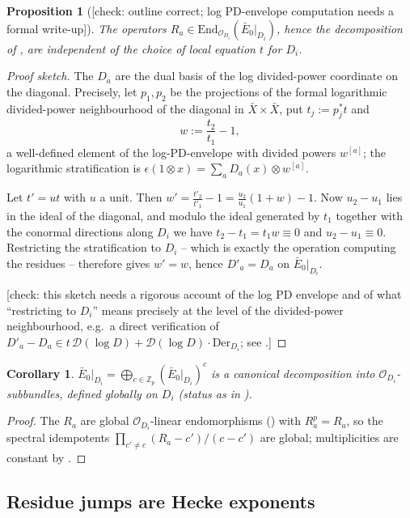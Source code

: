 \documentclass[11pt,reqno]{amsart}
\newcommand{\CHECK}[1]{{\color{blue!70!black}\textsf{[check: #1]}}}
\newcommand{\Zp}{\mathbb{Z}_p}
\newcommand{\cO}{\mathcal{O}}
\newcommand{\cD}{\mathcal{D}}
\newcommand{\End}{\mathrm{End}}
\theoremstyle{plain}
\newtheorem{proposition}[theorem]{Proposition}
\newtheorem{corollary}[theorem]{Corollary}
\theoremstyle{definition}
\theoremstyle{remark}
\numberwithin{equation}{section}
\begin{document}
\begin{proposition}[\CHECK{outline correct; log PD-envelope computation
needs a formal write-up}]\label{prop:coordfree}
The operators $R_a\in\End_{\cO_{D_i}}(\bar E_0|_{D_i})$, hence the
decomposition of , are independent of the choice of local
equation $t$ for $D_i$.
\end{proposition}
\begin{proof}[Proof sketch]
The $D_a$ are the dual basis of the log divided-power coordinate on the
diagonal.  Precisely, let $p_1,p_2$ be the projections of the formal
logarithmic divided-power neighbourhood of the diagonal in
$\bar X\times\bar X$, put $t_j:=p_j^*t$ and
\[
   w:=\frac{t_2}{t_1}-1 ,
\]
a well-defined element of the log-PD-envelope with divided powers
$w^{[a]}$; the logarithmic stratification is
$\epsilon(1\otimes x)=\sum_aD_a(x)\otimes w^{[a]}$.

Let $t'=ut$ with $u$ a unit.  Then
$w'=\tfrac{t'_2}{t'_1}-1=\tfrac{u_2}{u_1}(1+w)-1$.  Now $u_2-u_1$ lies in
the ideal of the diagonal, and modulo the ideal generated by $t_1$
together with the conormal directions along $D_i$ we have
$t_2-t_1=t_1w\equiv0$ and $u_2-u_1\equiv0$.  Restricting the
stratification to $D_i$ -- which is exactly the operation computing the
residues -- therefore gives $w'=w$, hence $D'_a=D_a$ on $\bar E_0|_{D_i}$.

\CHECK{this sketch needs a rigorous account of the log PD envelope and of
what ``restricting to $D_i$'' means precisely at the level of the
divided-power neighbourhood, e.g.\ a direct verification of
$D'_a-D_a\in t\,\cD(\log D)+\cD(\log D)\cdot\mathrm{Der}_{D_i}$; see
\Cref{rem:sec8status}.}
\end{proof}

\begin{corollary}\label{cor:globaldecomp}
$\bar E_0|_{D_i}=\bigoplus_{c\in\Zp}(\bar E_0|_{D_i})^c$ is a canonical
decomposition into $\cO_{D_i}$-subbundles, defined globally on $D_i$
(status as in ).
\end{corollary}
\begin{proof}
The $R_a$ are global $\cO_{D_i}$-linear endomorphisms
() with $R_a^p=R_a$, so the spectral
idempotents $\prod_{c'\ne c}(R_a-c')/(c-c')$ are global; multiplicities
are constant by .
\end{proof}

\subsection{Residue jumps are Hecke exponents}
\end{document}
